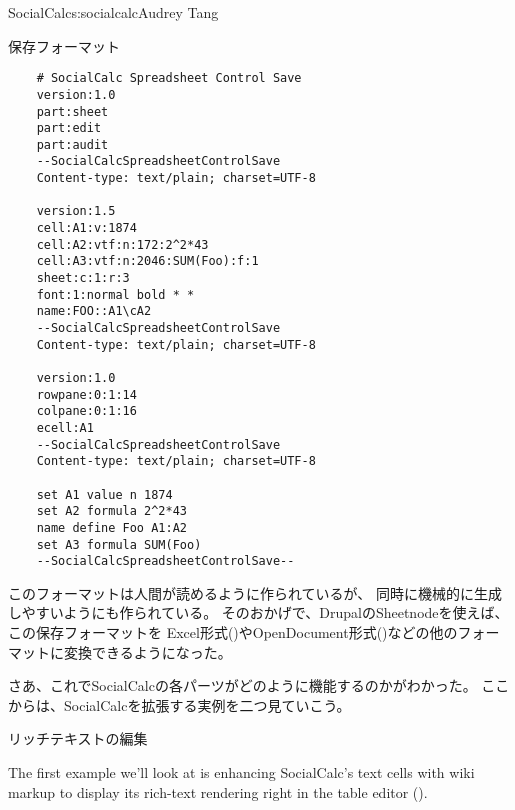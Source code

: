 \begin{aosachapter}{SocialCalc}{s:socialcalc}{Audrey Tang}
\begin{aosasect1}{保存フォーマット}
\begin{verbatim}
    # SocialCalc Spreadsheet Control Save
    version:1.0
    part:sheet
    part:edit
    part:audit
    --SocialCalcSpreadsheetControlSave
    Content-type: text/plain; charset=UTF-8

    version:1.5
    cell:A1:v:1874
    cell:A2:vtf:n:172:2^2*43
    cell:A3:vtf:n:2046:SUM(Foo):f:1
    sheet:c:1:r:3
    font:1:normal bold * *
    name:FOO::A1\cA2
    --SocialCalcSpreadsheetControlSave
    Content-type: text/plain; charset=UTF-8

    version:1.0
    rowpane:0:1:14
    colpane:0:1:16
    ecell:A1
    --SocialCalcSpreadsheetControlSave
    Content-type: text/plain; charset=UTF-8

    set A1 value n 1874
    set A2 formula 2^2*43
    name define Foo A1:A2
    set A3 formula SUM(Foo)
    --SocialCalcSpreadsheetControlSave--
\end{verbatim}

\noindent
このフォーマットは人間が読めるように作られているが、
同時に機械的に生成しやすいようにも作られている。
そのおかげで、DrupalのSheetnodeを使えば、この保存フォーマットを
Excel形式()やOpenDocument形式()などの他のフォーマットに変換できるようになった。

さあ、これでSocialCalcの各パーツがどのように機能するのかがわかった。
ここからは、SocialCalcを拡張する実例を二つ見ていこう。

\end{aosasect1}

\begin{aosasect1}{リッチテキストの編集}

The first example we'll look at is enhancing SocialCalc's text cells
with wiki markup to display its rich-text rendering right in the
table editor ().



\end{aosasect1}
\end{aosachapter}
